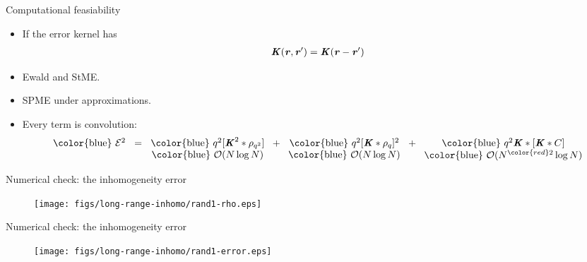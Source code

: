 \documentclass{beamer}
\newcommand{\redc}[1]{{\color{red} #1}}
\newcommand{\bluec}[1]{{\color{blue} #1}}
\newcommand{\vect}[1]{\textbf{\textit{#1}}}
\begin{document}
\begin{frame}{Computational feasiability}
  \begin{itemize}
    \vfill
  \item <1->
    If the error kernel has
    \bluec{
      \begin{align*}
        \vect K(\vect r, \vect r') = \vect K(\vect r - \vect r')
      \end{align*}
    }
  \item <2-> Ewald and StME.
    \vfill
  \item <3-> SPME under approximations.
    \vfill
  \item <4-> Every term is convolution:
    \begin{align*}
      \begin{tabular}[t]{c}
      \bluec{$\mathcal E^2$}\\
      {}
    \end{tabular}
    =
    \begin{tabular}[t]{c}
      \bluec{$q^2[\vect K^2\ast \rho_{q^2}]$}\\
      \bluec{$\mathcal O(N\log N)$}
    \end{tabular}
    +
    \begin{tabular}[t]{c}
      \bluec{$q^2[\vect K\ast \rho_q]^2$}\\
      \bluec{$\mathcal O(N\log N)$}
    \end{tabular}
    +
    \begin{tabular}[t]{c}
      \bluec{$q^2 \vect K\ast[\vect K\ast C]$}\\
      \bluec{$\mathcal O(N^\redc{2}\log N)$}
    \end{tabular}
    \end{align*}
    \vfill
  \end{itemize}
\end{frame}


\begin{frame}{Numerical check: the inhomogeneity error}
  \begin{figure}
    \centering
    \texttt{[image: figs/long-range-inhomo/rand1-rho.eps]}
  \end{figure}
\end{frame}

\begin{frame}{Numerical check: the inhomogeneity error}
  \begin{figure}
    \centering
    \texttt{[image: figs/long-range-inhomo/rand1-error.eps]}
  \end{figure}
\end{frame}
\end{document}
